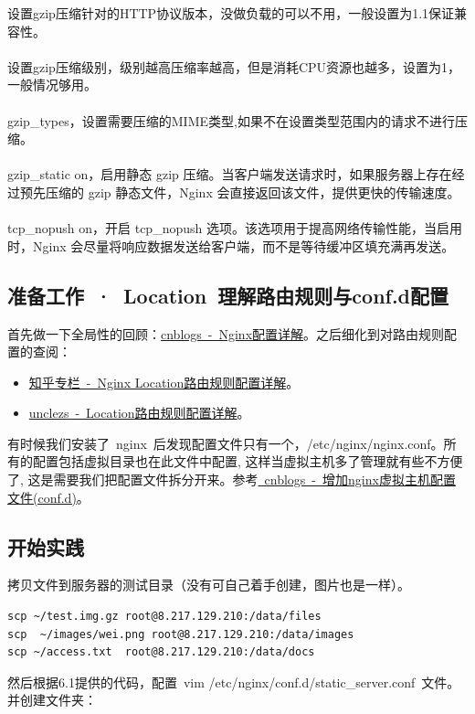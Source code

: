 \documentclass[12pt, a4paper]{article} %
\begin{document}
\begin{CJK*}{UTF8}{gbsn}
设置gzip压缩针对的HTTP协议版本，没做负载的可以不用，一般设置为1.1保证兼容性。\\\\
设置gzip压缩级别，级别越高压缩率越高，但是消耗CPU资源也越多，设置为1，一般情况够用。\\\\
gzip\_types，设置需要压缩的MIME类型,如果不在设置类型范围内的请求不进行压缩。 \\\\
gzip\_static on，启用静态 gzip 压缩。当客户端发送请求时，如果服务器上存在经过预先压缩的 gzip 静态文件，Nginx 会直接返回该文件，提供更快的传输速度。\\\\
tcp\_nopush on，开启 tcp\_nopush 选项。该选项用于提高网络传输性能，当启用时，Nginx 会尽量将响应数据发送给客户端，而不是等待缓冲区填充满再发送。

\subsection{准备工作~·~Location~理解路由规则与conf.d配置}

首先做一下全局性的回顾：\href{https://www.cnblogs.com/knowledgesea/p/5175711.html}{cnblogs~-~Nginx配置详解}。之后细化到对路由规则配置的查阅：
\begin{itemize}
    \item \href{https://zhuanlan.zhihu.com/p/627557214}{知乎专栏~-~Nginx Location路由规则配置详解}。
    \item \href{http://unclezs.com/pages/65844e}{unclezs~-~Location路由规则配置详解}。
\end{itemize}

有时候我们安装了~nginx~后发现配置文件只有一个，/etc/nginx/nginx.conf。所有的配置包括虚拟目录也在此文件中配置, 这样当虚拟主机多了管理就有些不方便了,
这是需要我们把配置文件拆分开来。参考\href{https://www.cnblogs.com/fps2tao/p/9958009.html}{~cnblogs~-~增加nginx虚拟主机配置文件(conf.d)}。

\subsection{开始实践}

拷贝文件到服务器的测试目录（没有可自己着手创建，图片也是一样）。
\begin{lstlisting}
scp ~/test.img.gz root@8.217.129.210:/data/files
scp  ~/images/wei.png root@8.217.129.210:/data/images
scp ~/access.txt  root@8.217.129.210:/data/docs
\end{lstlisting}
然后根据6.1提供的代码，配置~vim /etc/nginx/conf.d/static\_server.conf~文件。并创建文件夹：


\end{CJK*}
\end{document}

